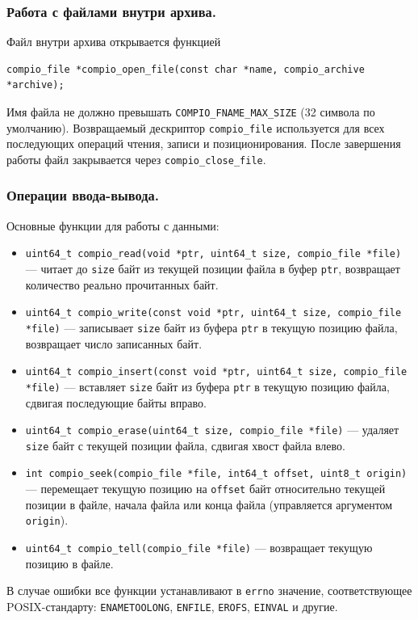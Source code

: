 \subsubsection{Работа с файлами внутри архива.}
Файл внутри архива открывается функцией
\begin{lstlisting}
compio_file *compio_open_file(const char *name, compio_archive *archive);
\end{lstlisting}
Имя файла не должно превышать \texttt{COMPIO\_FNAME\_MAX\_SIZE} (32 символа по умолчанию). Возвращаемый дескриптор \texttt{compio\_file} используется для всех последующих операций чтения, записи и позиционирования. После завершения работы файл закрывается через \texttt{compio\_close\_file}.

\subsubsection{Операции ввода-вывода.}
Основные функции для работы с данными:
\begin{itemize}
    \item \texttt{uint64\_t compio\_read(void *ptr, uint64\_t size, compio\_file *file)} --- читает до \texttt{size} байт из текущей позиции файла в буфер \texttt{ptr}, возвращает количество реально прочитанных байт.
    \item \texttt{uint64\_t compio\_write(const void *ptr, uint64\_t size, compio\_file *file)} --- записывает \texttt{size} байт из буфера \texttt{ptr} в текущую позицию файла, возвращает число записанных байт.
    \item \texttt{uint64\_t compio\_insert(const void *ptr, uint64\_t size, compio\_file *file)} --- вставляет \texttt{size} байт из буфера \texttt{ptr} в текущую позицию файла, сдвигая последующие байты вправо.
    \item \texttt{uint64\_t compio\_erase(uint64\_t size, compio\_file *file)} --- удаляет \texttt{size} байт с текущей позиции файла, сдвигая хвост файла влево.
    \item \texttt{int compio\_seek(compio\_file *file, int64\_t offset, uint8\_t origin)} --- перемещает текущую позицию на \texttt{offset} байт относительно текущей позиции в файле, начала файла или конца файла (управляется аргументом \texttt{origin}).
    \item \texttt{uint64\_t compio\_tell(compio\_file *file)} --- возвращает текущую позицию в файле.
\end{itemize}

В случае ошибки все функции устанавливают в \texttt{errno} значение, соответствующее POSIX-стандарту: \texttt{ENAMETOOLONG}, \texttt{ENFILE}, \texttt{EROFS}, \texttt{EINVAL} и другие.


